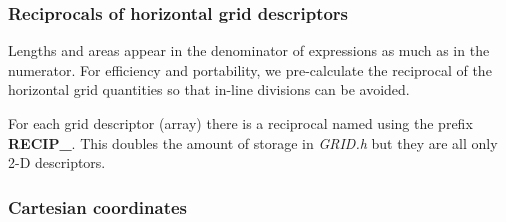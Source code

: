 \subsubsection{Reciprocals of horizontal grid descriptors}

Lengths and areas appear in the denominator of expressions as much as
in the numerator. For efficiency and portability, we pre-calculate the
reciprocal of the horizontal grid quantities so that in-line divisions
can be avoided.

For each grid descriptor (array) there is a reciprocal named using the
prefix {\bf RECIP\_}. This doubles the amount of storage in {\em
GRID.h} but they are all only 2-D descriptors.


\subsubsection{Cartesian coordinates}

